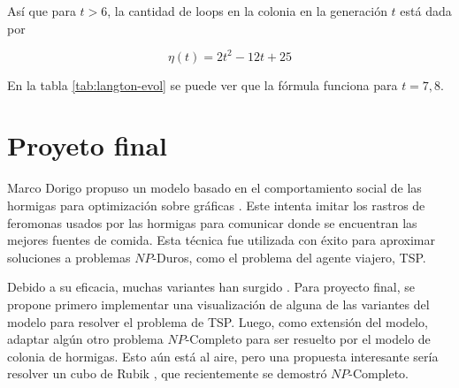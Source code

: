 \documentclass{article}
\begin{document}
Así que para $t > 6$, la cantidad de loops en la colonia en la generación $t$
está dada por

\begin{equation}
\label{eq:langton-final}
  \eta(t) = 2t^{2} - 12t + 25
\end{equation}

En la tabla \ref{tab:langton-evol} se puede ver que la fórmula funciona para
$t = 7, 8$.

\section{Proyeto final}

Marco Dorigo propuso un modelo basado en el comportamiento social de las
hormigas para optimización sobre gráficas \cite{Dorigo_1996}. Este intenta
imitar los rastros de feromonas usados por las hormigas para comunicar donde se
encuentran las mejores fuentes de comida. Esta técnica fue utilizada con éxito
para aproximar soluciones a problemas $NP$-Duros, como el problema del agente
viajero, TSP.

Debido a su eficacia, muchas variantes han surgido \cite{Dorigo_2006}. Para
proyecto final, se propone primero implementar una visualización de alguna de
las variantes del modelo para resolver el problema de TSP. Luego, como extensión
del modelo, adaptar algún otro problema $NP$-Completo para ser resuelto por el
modelo de colonia de hormigas. Esto aún está al aire, pero una propuesta
interesante sería resolver un cubo de Rubik \cite{Demaine_2018}, que
recientemente se demostró $NP$-Completo.

\printbibliography
\end{document}
